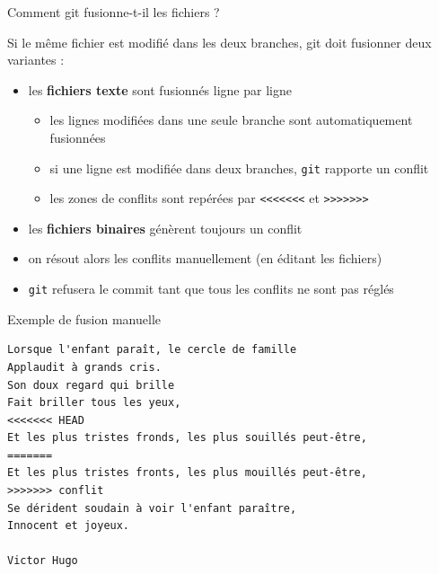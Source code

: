 \begin{frame}[fragile]{%
\protect\hypertarget{comment-git-fusionne-t-il-les-fichiers}{%
Comment git fusionne-t-il les fichiers ?}}

Si le même fichier est modifié dans les deux branches, git doit
fusionner deux variantes :

\begin{itemize}
\tightlist
\item
  les \textbf{fichiers texte} sont fusionnés ligne par ligne

  \begin{itemize}
  \tightlist
  \item
    les lignes modifiées dans une seule branche sont automatiquement
    fusionnées
  \item
    si une ligne est modifiée dans deux branches, \texttt{git} rapporte
    un conflit
  \item
    les zones de conflits sont repérées par
    \texttt{\textless{}\textless{}\textless{}\textless{}\textless{}\textless{}\textless{}}
    et
    \texttt{\textgreater{}\textgreater{}\textgreater{}\textgreater{}\textgreater{}\textgreater{}\textgreater{}}
  \end{itemize}
\item
  les \textbf{fichiers binaires} génèrent toujours un conflit
\item
  on résout alors les conflits manuellement (en éditant les fichiers)
\item
  \texttt{git} refusera le commit tant que tous les conflits ne sont pas
  réglés
\end{itemize}

\end{frame}

\begin{frame}[fragile]{%
\protect\hypertarget{exemple-de-fusion-manuelle}{%
Exemple de fusion manuelle}}

\begin{verbatim}
Lorsque l'enfant paraît, le cercle de famille
Applaudit à grands cris.
Son doux regard qui brille
Fait briller tous les yeux,
<<<<<<< HEAD
Et les plus tristes fronds, les plus souillés peut-être,
=======
Et les plus tristes fronts, les plus mouillés peut-être,
>>>>>>> conflit
Se dérident soudain à voir l'enfant paraître,
Innocent et joyeux.

Victor Hugo
\end{verbatim}

\end{frame}

